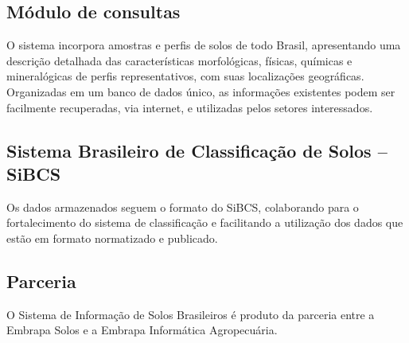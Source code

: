 \subsection{Módulo de consultas}

O sistema incorpora amostras e perfis de solos de todo Brasil, apresentando uma descrição detalhada das características morfológicas, físicas, químicas e mineralógicas de perfis representativos, com suas localizações geográficas. Organizadas em um banco de dados único, as informações existentes podem ser facilmente recuperadas, via internet, e utilizadas pelos setores interessados.

\subsection{Sistema Brasileiro de Classificação de Solos – SiBCS}

Os dados armazenados seguem o formato do SiBCS, colaborando para o fortalecimento do sistema de classificação e facilitando a utilização dos dados que estão em formato normatizado e publicado.

\subsection{Parceria}

O Sistema de Informação de Solos Brasileiros é produto da parceria entre a Embrapa Solos e a Embrapa Informática Agropecuária.

\address{Stanley Robson de Medeiros\\
  Embrapa Informática Agropecuária, Campinas, SP\\
  \url{www.embrapa.br/informatica-agropecuaria}\\
  }

\address{Humberto Gonçalves dos Santos\\
  Embrapa Solos, Rio de Janeiro, RJ\\
  \url{www.embrapa.br/solos}\\
  }

\address{Eliane de Paula Clemente\\
  Embrapa Solos, Rio de Janeiro, RJ\\
  \url{www.embrapa.br/solos}\\
  }
